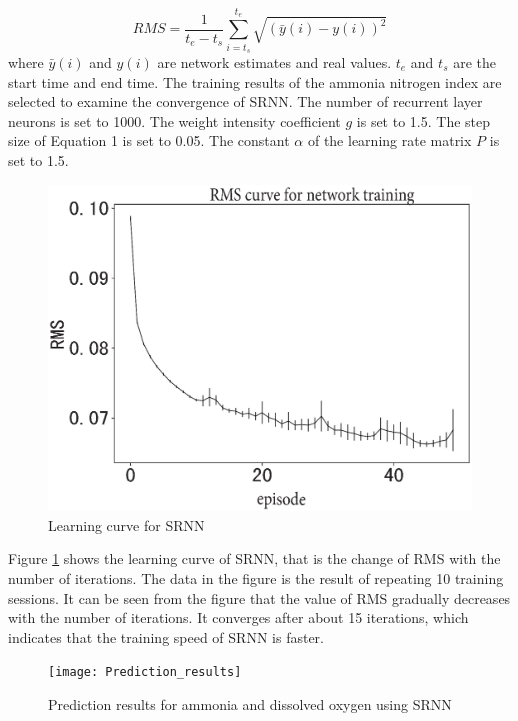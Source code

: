 \documentclass[runningheads]{llncs}
\begin{document}
\begin{equation}
RMS=  \frac{1}{t_e-t_s}\sum_{i=t_s}^{t_e}\sqrt{(\bar y(i)- y(i))^2}
\end{equation}
where $\bar y(i)$ and $y(i)$ are network estimates and real values. 
$t_e$ and $t_s$ are the start time and end time. The training results of the ammonia 
nitrogen index are selected to examine the convergence of SRNN. 
The number of recurrent layer neurons is set to 1000.
The weight intensity coefficient $g$ is set to 1.5. 
The step size of Equation 1 is set to 0.05. 
The constant $\alpha$ of the learning rate matrix $P$ is set to 1.5.
\begin{figure}[htbp]
\centering
\includegraphics[width=\columnwidth]{Learning_curve}
\caption{Learning curve for SRNN}
\label{Learning curve for SRNN}
\end{figure}

Figure \ref{Learning curve for SRNN} shows the learning curve of SRNN, that is the change of 
RMS with the number of iterations. The data in the figure is the 
result of repeating 10 training sessions. 
It can be seen from the figure that the value of RMS 
gradually decreases with the number of iterations. 
It converges after about 15 iterations, which indicates that the training 
speed of SRNN is faster.

\begin{figure}[htbp]
\centering
\texttt{[image: Prediction\_results]}
\caption{Prediction results for ammonia and dissolved oxygen using SRNN}
\label{Prediction results for ammonia and dissolved oxygen using SRNN}
\end{figure}
\end{document}
